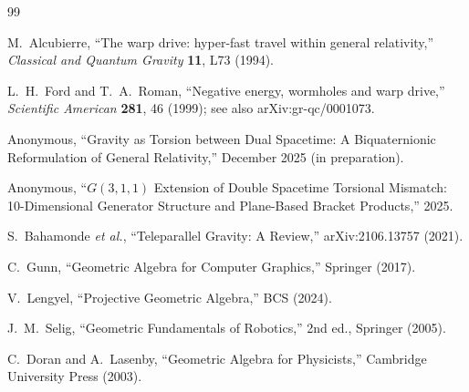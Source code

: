 \documentclass[dvipdfmx,a4paper]{article}
\theoremstyle{definition}
\begin{document}
\begin{thebibliography}{99}

M.~Alcubierre,
``The warp drive: hyper-fast travel within general relativity,''
\emph{Classical and Quantum Gravity} \textbf{11}, L73 (1994).

L.~H.~Ford and T.~A.~Roman,
``Negative energy, wormholes and warp drive,''
\emph{Scientific American} \textbf{281}, 46 (1999);
see also arXiv:gr-qc/0001073.

Anonymous,
``Gravity as Torsion between Dual Spacetime: A Biquaternionic Reformulation of General Relativity,''
December 2025 (in preparation).

Anonymous,
``\(G(3,1,1)\) Extension of Double Spacetime Torsional Mismatch: 10-Dimensional Generator Structure and Plane-Based Bracket Products,''
2025.

S.~Bahamonde \emph{et al.},
``Teleparallel Gravity: A Review,''
arXiv:2106.13757 (2021).

C.~Gunn,
``Geometric Algebra for Computer Graphics,''
Springer (2017).

V.~Lengyel,
``Projective Geometric Algebra,''
BCS (2024).

J.~M.~Selig,
``Geometric Fundamentals of Robotics,''
2nd ed., Springer (2005).

C.~Doran and A.~Lasenby,
``Geometric Algebra for Physicists,''
Cambridge University Press (2003).

\end{thebibliography}
\end{document}
